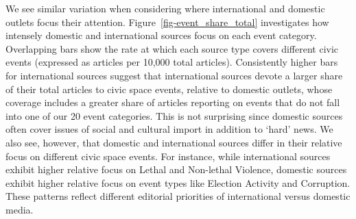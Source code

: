 \documentclass[
  letterpaper,
  DIV=11,
  numbers=noendperiod]{scrartcl}
\begin{document}
We see similar variation when considering where international and
domestic outlets focus their attention.
Figure~\ref{fig-event_share_total} investigates how intensely domestic
and international sources focus on each event category. Overlapping bars
show the rate at which each source type covers different civic events
(expressed as articles per 10,000 total articles). Consistently higher
bars for international sources suggest that international sources devote
a larger share of their total articles to civic space events, relative
to domestic outlets, whose coverage includes a greater share of articles
reporting on events that do not fall into one of our 20 event
categories. This is not surprising since domestic sources often cover
issues of social and cultural import in addition to `hard' news. We also
see, however, that domestic and international sources differ in their
relative focus on different civic space events. For instance, while
international sources exhibit higher relative focus on Lethal and
Non-lethal Violence, domestic sources exhibit higher relative focus on
event types like Election Activity and Corruption. These patterns
reflect different editorial priorities of international versus domestic
media.
\end{document}

